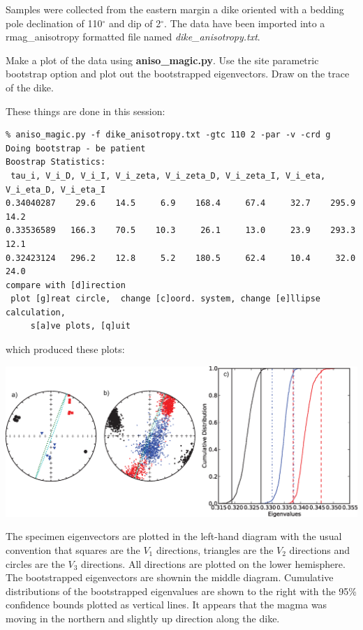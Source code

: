 \documentclass[11pt]{book}
\begin{document}
{Samples were collected from the eastern margin a dike  oriented  with a bedding pole declination of 110$^{\circ}$ and dip of 2$^{\circ}$.      The data have been imported into a rmag\_anisotropy formatted file named {\it dike\_anisotropy.txt}.

Make a plot of the data using {\bf aniso\_magic.py}.  Use the site parametric bootstrap option and plot out the bootstrapped eigenvectors.   Draw on the trace of the dike.

These things  are done in this session:

\begin{verbatim}
% aniso_magic.py -f dike_anisotropy.txt -gtc 110 2 -par -v -crd g
Doing bootstrap - be patient
Boostrap Statistics:
 tau_i, V_i_D, V_i_I, V_i_zeta, V_i_zeta_D, V_i_zeta_I, V_i_eta, V_i_eta_D, V_i_eta_I
0.34040287    29.6    14.5     6.9    168.4     67.4     32.7    295.9     14.2
0.33536589   166.3    70.5    10.3     26.1     13.0     23.9    293.3     12.1
0.32423124   296.2    12.8     5.2    180.5     62.4     10.4     32.0     24.0
compare with [d]irection
 plot [g]reat circle,  change [c]oord. system, change [e]llipse calculation,
     s[a]ve plots, [q]uit

\end{verbatim}

{\noindent which produced these plots:}


  \includegraphics[width=15cm]{EPSfiles/dike.eps}

The specimen eigenvectors are plotted in the left-hand diagram with the usual convention that squares are the $V_1$ directions, triangles are the $V_2$ directions and circles are the $V_3$ directions.  All directions are plotted on the lower hemisphere.     The bootstrapped eigenvectors are shownin the middle diagram.   Cumulative distributions of the bootstrapped eigenvalues are shown to the right with the 95\% confidence bounds plotted as vertical lines.
It appears that the magma was moving in the northern and slightly up direction along the dike.

}
\end{document}
